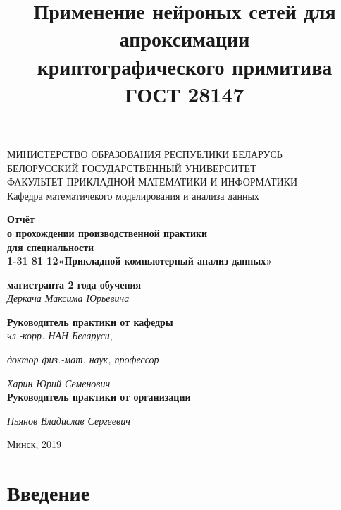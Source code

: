 \documentclass[a4paper,12pt,twoside]{article}
\title{Применение нейроных сетей для апроксимации\\ криптографического примитива ГОСТ 28147}
\begin{document}
	\begin{center}
		{МИНИСТЕРСТВО  ОБРАЗОВАНИЯ  РЕСПУБЛИКИ  БЕЛАРУСЬ\\
			БЕЛОРУССКИЙ ГОСУДАРСТВЕННЫЙ УНИВЕРСИТЕТ\\
			ФАКУЛЬТЕТ ПРИКЛАДНОЙ МАТЕМАТИКИ И ИНФОРМАТИКИ} \\
		{Кафедра математичекого моделирования и анализа данных}
		
	\end{center}
	
	\begin{center}
		\bigskip
		\bigskip
		\bigskip
		\bigskip
		\textbf{Отчёт\\ о прохождении производственной практики\\ для специальности \\
			1-31 81 12«Прикладной компьютерный анализ данных»}
	\end{center}
	
	\bigskip
	\bigskip
	\bigskip
	\bigskip
	\bigskip
	
	\hfil\hfil\hfil\hfil	\textbf{магистранта 2 года обучения}\\
	\bigskip
	\hfil\hfil\hfil\hfil\hfil	\textit{Деркача Максима Юрьевича}\\
	\bigskip
	
	\hfil\hfil\hfil\hfil	\textbf{Руководитель практики от кафедры}\\
	
	\hfil\hfil\hfil\hfil\hfil	\textit{чл.-корр. НАН Беларуси},
	
	\hfil\hfil\hfil\hfil	\textit{доктор физ.-мат. наук, профессор}
	
	\hfil\hfil\hfil\hfil\hfil	\textit{Харин Юрий Семенович}\\

	
	\hfil\hfil\hfil\hfil	\textbf{Руководитель практики от организации}
	
	\bigskip
	\hfil\hfil\hfil\hfil\hfil	\textit{Пьянов Владислав Сергеевич}\\
	
	\bigskip
	\bigskip
	\bigskip
	\bigskip
	\bigskip
	\bigskip
	\bigskip
	\bigskip
	\bigskip
	
	\begin{center}
		Минск, 2019
	\end{center}
	
	
	\newpage
	
	{
		\renewcommand{\contentsname}{Оглавление}
		\tableofcontents
	}
	
	\newpage
	\section{Введение}
	\bigskip
	
\end{document}
